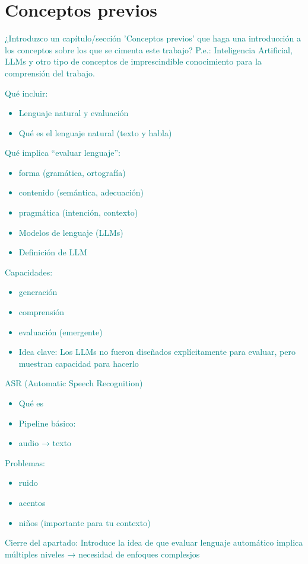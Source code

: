 \section{Conceptos previos}
\textcolor{teal}{¿Introduzco un capítulo/sección 'Conceptos previos' que haga una introducción a los conceptos sobre los que se cimenta este trabajo? P.e.: Inteligencia Artificial, LLMs y otro tipo de conceptos de imprescindible conocimiento para la comprensión del trabajo.}

\textcolor{teal}{
    Qué incluir:
    \begin{itemize}
        \item Lenguaje natural y evaluación
        \item Qué es el lenguaje natural (texto y habla)
    \end{itemize}
    Qué implica “evaluar lenguaje”:
    \begin{itemize}
        \item forma (gramática, ortografía)
        \item contenido (semántica, adecuación)
        \item pragmática (intención, contexto)
        \item Modelos de lenguaje (LLMs)
        \item Definición de LLM
    \end{itemize} 
    Capacidades:
    \begin{itemize}
        \item generación
        \item comprensión
        \item evaluación (emergente)
        \item Idea clave:
            Los LLMs no fueron diseñados explícitamente para evaluar, pero muestran capacidad para hacerlo
    \end{itemize}
    ASR (Automatic Speech Recognition)
    \begin{itemize}
        \item Qué es
        \item Pipeline básico:
        \item audio → texto
    \end{itemize}
    Problemas:
    \begin{itemize}
        \item ruido
        \item acentos
        \item niños (importante para tu contexto)
    \end{itemize}
    Cierre del apartado:
    Introduce la idea de que evaluar lenguaje automático implica múltiples niveles → necesidad de enfoques complesjos
}
